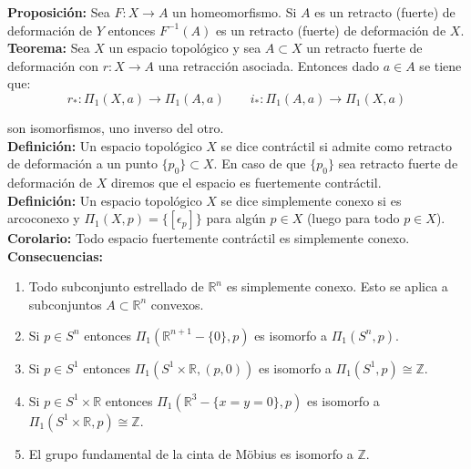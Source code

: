 \documentclass{article}
\begin{document}
\textbf{Proposición:} Sea $F:X\rightarrow A$ un homeomorfismo. Si $A$ es un retracto (fuerte) de deformación de $Y$ entonces $F^{-1}(A)$ es un retracto (fuerte) de deformación de $X$. \\

\textbf{Teorema:} Sea $X$ un espacio topológico y sea $A\subset X$ un retracto fuerte de deformación con $r:X\rightarrow A$ una retracción asociada. Entonces dado $a\in A$ se tiene que:
\begin{equation*}
r_*:\Pi_1(X,a)\rightarrow \Pi_1(A,a)\qquad i_*:\Pi_1(A,a)\rightarrow \Pi_1(X,a)
\end{equation*}

son isomorfismos, uno inverso del otro.\\

\textbf{Definición:} Un espacio topológico $X$ se dice contráctil si admite como retracto de deformación a un punto $\{p_0\}\subset X$. En caso de que $\{p_0\}$ sea retracto fuerte de deformación de $X$ diremos que el espacio es fuertemente contráctil.\\

\textbf{Definición:} Un espacio topológico $X$ se dice simplemente conexo si es arcoconexo y $\Pi_1(X,p)=\{[\epsilon_p]\}$ para algún $p\in X$ (luego para todo $p\in X$).\\

\textbf{Corolario:} Todo espacio fuertemente contráctil es simplemente conexo.\\

\textbf{Consecuencias:} 
\begin{enumerate}
\item Todo subconjunto estrellado de $\mathbb{R}^n$ es simplemente conexo. Esto se aplica a subconjuntos $A\subset \mathbb{R}^n$ convexos.

\item Si $p\in S^n$ entonces $\Pi_1(\mathbb{R}^{n+1}-\{0\},p)$ es isomorfo a $\Pi_1(S^n,p)$.

\item Si $p\in S^1$ entonces $\Pi_1(S^1\times \mathbb{R},(p,0))$ es isomorfo a $\Pi_1(S^1,p)\cong \mathbb{Z}$.

\item Si $p\in S^1\times \mathbb{R}$ entonces $\Pi_1(\mathbb{R}^3-\{x=y=0\},p)$ es isomorfo a $\Pi_1(S^1\times \mathbb{R},p)\cong \mathbb{Z}$.

\item El grupo fundamental de la cinta de Möbius es isomorfo a $\mathbb{Z}$.
\end{enumerate} 
\end{document}
